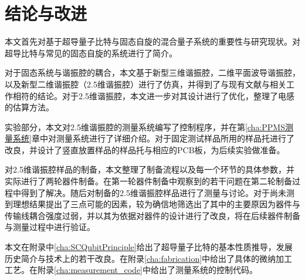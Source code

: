 
\chapter{结论与改进} %
\label{cha:结论与改进}
	本文首先对基于超导量子比特与固态自旋的混合量子系统的重要性与研究现状。对超导比特与常见的固态自旋的系统进行了简介。

	对于固态系统与谐振腔的耦合，本文基于新型三维谐振腔，二维平面波导谐振腔，以及新型二维谐振腔（2.5维谐振腔）进行了仿真，并得到了与现有文献与相关工作相符的结论。对于2.5维谐振腔，本文进一步对其设计进行了优化，整理了电感的估算方法。

	实验部分，本文对2.5维谐振腔的测量系统编写了控制程序，并在第\ref{cha:PPMS测量系统}章中对测量系统进行了详细介绍。对于固定测试样品所用的样品托进行了改良，并设计了竖直放置样品的样品托与相应的PCB板，为后续实验做准备。

	对2.5维谐振腔样品的制备，本文整理了制备流程以及每一个环节的具体参数，并实际进行了两轮器件制备。在第一轮器件制备中观察到的若干问题在第二轮制备过程中得到了解决。随后对制备的2.5维谐振腔样品进行了测量与讨论。对于尚未测到理想结果提出了三点可能的因素，较为确信地筛选出了其中的主要原因为器件与传输线耦合强度过弱，并以其为依据对器件的设计进行了改良，将在后续器件制备与测量过程中进行验证。

	本文在附录中\ref{cha:SCQubitPrinciple}给出了超导量子比特的基本性质推导，发展历史简介与技术上的若干改良。在附录\ref{cha:fabrication}中给出了具体的微纳加工工艺。在附录\ref{cha:measurement_code}中给出了测量系统的控制代码。


